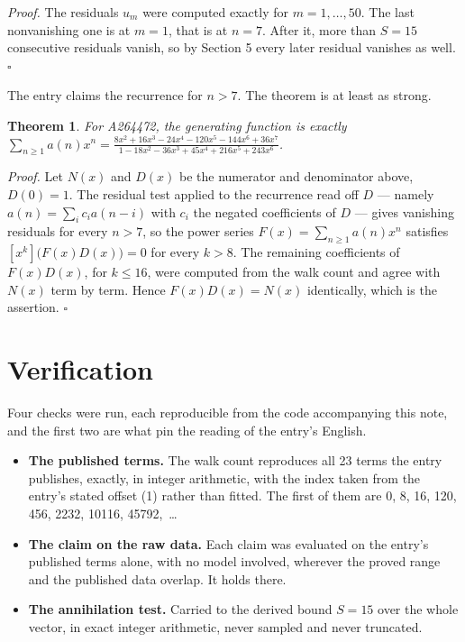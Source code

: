\documentclass[11pt]{article}
\newtheorem{theorem}{Theorem}
\theoremstyle{definition}
\begin{document}
{\itshape Proof.} The residuals $u_m$ were computed exactly for $m = 1,\dots,50$. The last nonvanishing one is at $m = 1$, that is at $n = 7$. After it, more than $S = 15$ consecutive residuals vanish, so by Section 5 every later residual vanishes as well. $\square$

The entry claims the recurrence for $n > 7$. The theorem is at least as strong.

\begin{theorem} For A264472, the generating function is exactly $\sum_{n\ge 1} a(n)x^n = \frac{8x^{2} + 16x^{3} - 24x^{4} - 120x^{5} - 144x^{6} + 36x^{7}}{1 - 18x^{2} - 36x^{3} + 45x^{4} + 216x^{5} + 243x^{6}}$.\end{theorem}

{\itshape Proof.} Let $N(x)$ and $D(x)$ be the numerator and denominator above, $D(0)=1$. The residual test applied to the recurrence read off $D$ --- namely $a(n) = \sum_i c_i a(n-i)$ with $c_i$ the negated coefficients of $D$ --- gives vanishing residuals for every $n > 7$, so the power series $F(x)=\sum_{n\ge 1}a(n)x^n$ satisfies $[x^k]\bigl(F(x)D(x)\bigr) = 0$ for every $k > 8$. The remaining coefficients of $F(x)D(x)$, for $k \le 16$, were computed from the walk count and agree with $N(x)$ term by term. Hence $F(x)D(x) = N(x)$ identically, which is the assertion. $\square$

\section{Verification}

Four checks were run, each reproducible from the code accompanying this note, and the first two are what pin the reading of the entry's English.

\begin{itemize}

\item {\bfseries The published terms.} The walk count reproduces all 23 terms the entry publishes, exactly, in integer arithmetic, with the index taken from the entry's stated offset (1) rather than fitted. The first of them are 0, 8, 16, 120, 456, 2232, 10116, 45792,~\dots

\item {\bfseries The claim on the raw data.} Each claim was evaluated on the entry's published terms alone, with no model involved, wherever the proved range and the published data overlap. It holds there.

\item {\bfseries The annihilation test.} Carried to the derived bound $S = 15$ over the whole vector, in exact integer arithmetic, never sampled and never truncated.

\end{itemize}
\end{document}
